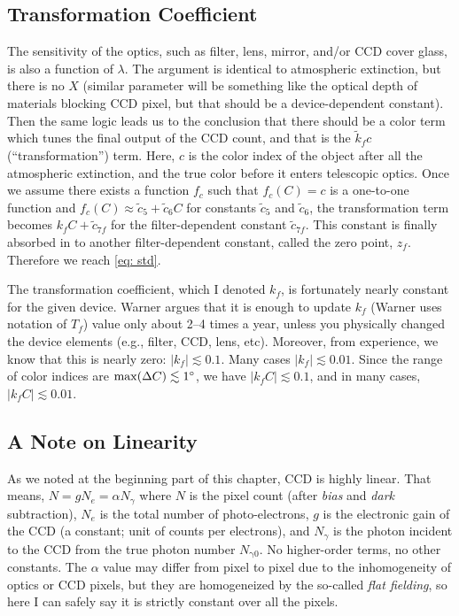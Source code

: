 \subsection{Transformation Coefficient}
The sensitivity of the optics, such as filter, lens, mirror, and/or CCD cover glass, is also a function of $ \lambda $. The argument is identical to atmospheric extinction, but there is no $ X $ (similar parameter will be something like the optical depth of materials blocking CCD pixel, but that should be a device-dependent constant). Then the same logic leads us to the conclusion that there should be a color term which tunes the final output of the CCD count, and that is the $ \tilde{k}_f c $ (``transformation'') term. Here, $ c $ is the color index of the object after all the atmospheric extinction, and the true color before it enters telescopic optics. Once we assume there exists a function $ f_c $ such that $ f_c(C) = c $ is a one-to-one function and $ f_c(C) \approx \tilde{c}_5 + \tilde{c}_6 C $ for constants $ \tilde{c}_5 $ and $ \tilde{c}_6 $, the transformation term becomes $ k_f C + \tilde{c}_{7f} $ for the filter-dependent constant $ \tilde{c}_{7f} $. This constant is finally absorbed in to another filter-dependent constant, called the zero point, $ z_f $. Therefore we reach \cref{eq: std}.

The transformation coefficient, which I denoted $ k_f $, is fortunately nearly constant for the given device. Warner argues that it is enough to update $ k_f $ (Warner uses notation of $ T_f $) value only about 2--4 times a year, unless you physically changed the device elements (e.g., filter, CCD, lens, etc). Moreover, from experience, we know that this is nearly zero: $ |k_f| \lesssim 0.1 $. Many cases $ |k_f| \lesssim 0.01 $. Since the range of color indices are $ \mathrm{max}(\Delta C) \lesssim \m{1} $, we have $ |k_f C| \lesssim 0.1 $, and in many cases, $ |k_f C| \lesssim 0.01 $.


\subsection{A Note on Linearity} \label{ss: linearity note}
As we noted at the beginning part of this chapter, CCD is highly linear. That means, $ N = g N_e = \alpha N_\gamma $ where $ N $ is the pixel count (after \emph{bias} and \emph{dark} subtraction), $ N_e $ is the total number of photo-electrons, $ g $ is the electronic gain of the CCD (a constant; unit of counts per electrons), and $ N_\gamma $ is the photon incident to the CCD from the true photon number $ N_\mathrm{\gamma 0} $. No higher-order terms, no other constants. The $ \alpha $ value may differ from pixel to pixel due to the inhomogeneity of optics or CCD pixels, but they are homogeneized by the so-called \emph{flat fielding}, so here I can safely say it is strictly constant over all the pixels. 

